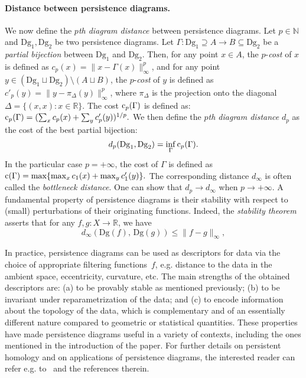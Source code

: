 \documentclass[11pt]{article}
\newcommand{\R}{\mathbb{R}}
\newcommand{\Dg}{\mathrm{Dg}}
\begin{document}
\paragraph*{Distance between persistence diagrams.}
We now define the {\em $p$th diagram distance} between persistence diagrams.
Let $p\in\mathbb{N}$ and $\Dg_1,\Dg_2$ be two persistence diagrams. 
Let $\Gamma:\Dg_1\supseteq A\rightarrow B\subseteq \Dg_2$ be a {\em partial bijection} between $\Dg_1$ and $\Dg_2$.
Then, for any point $x\in A$, the $p$-{\em cost} of $x$ is defined as $c_p(x)=\|x-\Gamma(x)\|_\infty^p$,
and for any point $y\in(\Dg_1\sqcup \Dg_2)\setminus (A\sqcup B)$, the $p$-{\em cost} of $y$ is defined as 
$c'_p(y)=\|y-\pi_\Delta(y)\|_\infty^p$, where $\pi_\Delta$ is the projection 
onto the diagonal~$\Delta=\{(x,x) : x\in\R\}$.
The cost $\operatorname{c}_p(\Gamma)$ is defined as:
$\operatorname{c}_p(\Gamma)=(\sum_x c_p(x) + \sum_y c'_p(y))^{1/p}.$
We then define the {\em $p$th diagram distance}
 $d_p$ as the cost of the best partial bijection: $$d_p(\Dg_1,\Dg_2) = \inf_\Gamma \cost_p(\Gamma).$$
In the particular case $p=+\infty$, the cost of $\Gamma$ is defined as 
$\operatorname{c}(\Gamma)=\max\{\max_x c_1(x) + \max_y c'_1(y)\}.$
The corresponding distance $d_\infty$ is often called the {\em bottleneck distance}.
One can show that $d_p\rightarrow d_\infty$ when $p\rightarrow +\infty$.
A fundamental property of persistence diagrams is their stability with
respect to (small) perturbations of their originating functions.
Indeed, the {\em stability theorem}~\cite{Bauer13b,Chazal09a,Chazal16a,Cohen07}
asserts that 
for any
$f,g:X\to\R$, we have
\begin{equation}\label{eq:PD_stab}
d_\infty(\Dg(f),\, \Dg(g))\leq \|f-g\|_\infty,
\end{equation}

In practice, persistence diagrams can be used as descriptors for data
via the choice of appropriate filtering functions~$f$, e.g.  distance
to the data in the ambient space, eccentricity, curvature, etc. The
main strengths of the obtained descriptors are: (a) to be provably stable as
 mentioned previously; (b) to be invariant under reparametrization of the
data; and (c) to encode information about the topology of the data,
which is complementary and of an essentially different nature compared
to geometric or statistical quantities.
These properties have made persistence diagrams useful in a variety of
contexts, including the ones mentioned in the introduction of the
paper.
For further details on persistent homology and on applications of
persistence diagrams, the interested reader can refer
e.g. to~\cite{Oudot15} and the references therein.
\end{document}
